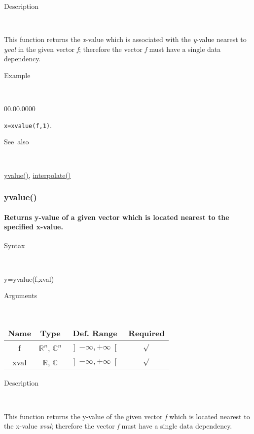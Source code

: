 \begin{description}
\item [Description]~
\end{description}
This function returns the \textit{x}-value which is associated with
the \textit{y}-value nearest to \textit{yval} in the given vector
\textit{f}; therefore the vector \textit{f} must have a single data
dependency.

\begin{description}
\item [Example]~
\end{description}
\begin{lyxlist}{00.00.0000}
\item [\texttt{x=xvalue(f,1)}.]~
\end{lyxlist}
\begin{description}
\item [See~also]~
\end{description}
\textcolor{blue}{\hyperlink{yvalue}{yvalue()}}\textcolor{black}{,}
\textcolor{blue}{\hyperlink{interpolate}{interpolate()}}


\newpage
\subsubsection*{\hypertarget{yvalue}{}{\Large yvalue()}}


\paragraph{\label{par:yvalue}Returns y-value of a given vector which is located
nearest to the specified x-value.}

\begin{description}
\item [Syntax]~
\end{description}
y=yvalue(f,xval)

\begin{description}
\item [Arguments]~
\end{description}
\begin{tabular}{|c|c|c|c|}
\hline 
Name&
Type&
Def. Range&
Required\tabularnewline
\hline
\hline 
f&
$\mathbb{R}^{n}$, $\mathbb{C}^{n}$&
$\left]-\infty,+\infty\right[$&
$\surd$\tabularnewline
\hline
xval&
$\mathbb{R}$, $\mathbb{C}$&
$\left]-\infty,+\infty\right[$&
$\surd$\tabularnewline
\hline
\end{tabular}

\begin{description}
\item [Description]~
\end{description}
This function returns the y-value of the given vector \textit{f} which
is located nearest to the x-value \textit{xval}; therefore the vector
\textit{f} must have a single data dependency.

